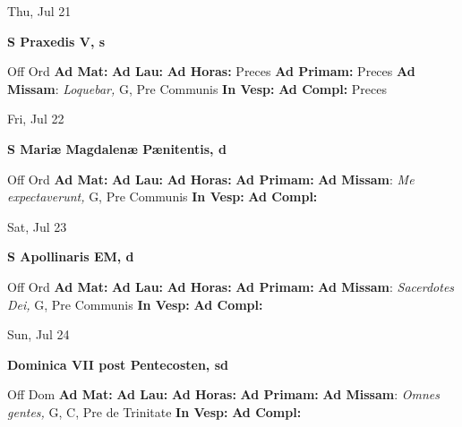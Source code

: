 \documentclass[10pt]{article}
\begin{document}
\begin{minipage}{3.5in}
\vspace{2em}\begin{center}
Thu, Jul 21
\end{center}\textbf{ \large S Praxedis V, \textnormal{\normalsize s}}
\begin{justify}
Off Ord
\textbf{Ad Mat: }
\textbf{Ad Lau: }
\textbf{Ad Horas: }Preces
\textbf{Ad Primam: }Preces
\textbf{Ad Missam}: \textit{Loquebar,} G, Pre Communis
\textbf{In Vesp: }
\textbf{Ad Compl: }Preces\end{justify}
\end{minipage}



\begin{minipage}{3.5in}
\vspace{2em}\begin{center}
Fri, Jul 22
\end{center}\textbf{ \large S Mariæ Magdalenæ Pænitentis, \textnormal{\normalsize d}}
\begin{justify}
Off Ord
\textbf{Ad Mat: }
\textbf{Ad Lau: }
\textbf{Ad Horas: }
\textbf{Ad Primam: }
\textbf{Ad Missam}: \textit{Me expectaverunt,} G, Pre Communis
\textbf{In Vesp: }
\textbf{Ad Compl: }\end{justify}
\end{minipage}



\begin{minipage}{3.5in}
\vspace{2em}\begin{center}
Sat, Jul 23
\end{center}\textbf{ \large S Apollinaris EM, \textnormal{\normalsize d}}
\begin{justify}
Off Ord
\textbf{Ad Mat: }
\textbf{Ad Lau: }
\textbf{Ad Horas: }
\textbf{Ad Primam: }
\textbf{Ad Missam}: \textit{Sacerdotes Dei,} G, Pre Communis
\textbf{In Vesp: }
\textbf{Ad Compl: }\end{justify}
\end{minipage}



\begin{minipage}{3.5in}
\vspace{2em}\begin{center}
Sun, Jul 24
\end{center}\textbf{ \large Dominica VII post Pentecosten, \textnormal{\normalsize sd}}
\begin{justify}
Off Dom
\textbf{Ad Mat: }
\textbf{Ad Lau: }
\textbf{Ad Horas: }
\textbf{Ad Primam: }
\textbf{Ad Missam}: \textit{Omnes gentes,} G, C, Pre de Trinitate
\textbf{In Vesp: }
\textbf{Ad Compl: }\end{justify}
\end{minipage}
\end{document}
